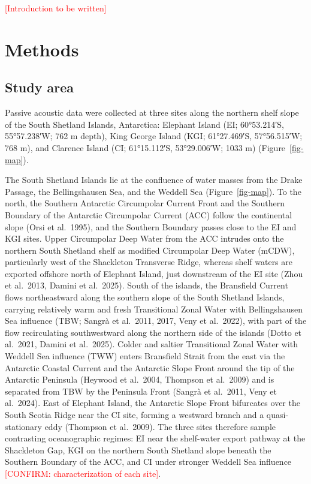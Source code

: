 \documentclass[
  11pt,
]{article}
\newcommand{\ins}[1]{\textcolor{red}{[#1]}}
\newcommand{\conf}[1]{\textcolor{red}{[CONFIRM: #1]}}
\begin{document}
\ins{Introduction to be written}

\section{Methods}\label{methods}

\subsection{Study area}\label{sec-study}

Passive acoustic data were collected at three sites along the northern
shelf slope of the South Shetland Islands, Antarctica: Elephant Island
(EI; 60°53.214′S, 55°57.238′W; 762 m depth), King George Island (KGI;
61°27.469′S, 57°56.515′W; 768 m), and Clarence Island (CI; 61°15.112′S,
53°29.006′W; 1033 m) (Figure~\ref{fig-map}).

The South Shetland Islands lie at the confluence of water masses from
the Drake Passage, the Bellingshausen Sea, and the Weddell Sea
(Figure~\ref{fig-map}). To the north, the Southern Antarctic Circumpolar
Current Front and the Southern Boundary of the Antarctic Circumpolar
Current (ACC) follow the continental slope (Orsi et al.~1995), and the
Southern Boundary passes close to the EI and KGI sites. Upper
Circumpolar Deep Water from the ACC intrudes onto the northern South
Shetland shelf as modified Circumpolar Deep Water (mCDW), particularly
west of the Shackleton Transverse Ridge, whereas shelf waters are
exported offshore north of Elephant Island, just downstream of the EI
site (Zhou et al.~2013, Damini et al.~2025). South of the islands, the
Bransfield Current flows northeastward along the southern slope of the
South Shetland Islands, carrying relatively warm and fresh Transitional
Zonal Water with Bellingshausen Sea influence (TBW; Sangrà et al.~2011,
2017, Veny et al.~2022), with part of the flow recirculating
southwestward along the northern side of the islands (Dotto et al.~2021,
Damini et al.~2025). Colder and saltier Transitional Zonal Water with
Weddell Sea influence (TWW) enters Bransfield Strait from the east via
the Antarctic Coastal Current and the Antarctic Slope Front around the
tip of the Antarctic Peninsula (Heywood et al.~2004, Thompson et
al.~2009) and is separated from TBW by the Peninsula Front (Sangrà et
al.~2011, Veny et al.~2024). East of Elephant Island, the Antarctic
Slope Front bifurcates over the South Scotia Ridge near the CI site,
forming a westward branch and a quasi-stationary eddy (Thompson et
al.~2009). The three sites therefore sample contrasting oceanographic
regimes: EI near the shelf-water export pathway at the Shackleton Gap,
KGI on the northern South Shetland slope beneath the Southern Boundary
of the ACC, and CI under stronger Weddell Sea influence
\conf{characterization of each site}.
\end{document}
